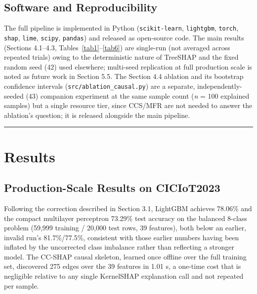 \subsection{Software and Reproducibility}\label{software-and-reproducibility}

The full pipeline is implemented in Python (\texttt{scikit-learn}, \texttt{lightgbm}, \texttt{torch}, \texttt{shap}, \texttt{lime}, \texttt{scipy}, \texttt{pandas}) and released as open-source code. The main results (Sections 4.1--4.3, Tables~\ref{tab1}--\ref{tab6}) are single-run (not averaged across repeated trials) owing to the deterministic nature of TreeSHAP and the fixed random seed (42) used elsewhere; multi-seed replication at full production scale is noted as future work in Section 5.5. The Section 4.4 ablation and its bootstrap confidence intervals (\texttt{src/ablation\_causal.py}) are a separate, independently-seeded (43) companion experiment at the same sample count (\emph{n} = 100 explained samples) but a single resource tier, since CCS/MFR are not needed to answer the ablation's question; it is released alongside the main pipeline.

\begin{center}\rule{0.5\linewidth}{0.5pt}\end{center}

\section{Results}\label{results}

\subsection{Production-Scale Results on CICIoT2023}\label{production-scale-results-on-ciciot2023}

Following the correction described in Section 3.1, LightGBM achieves 78.06\% and the compact multilayer perceptron 73.29\% test accuracy on the balanced 8-class problem (59,999 training / 20,000 test rows, 39 features), both below an earlier, invalid run's 81.7\%/77.5\%, consistent with those earlier numbers having been inflated by the uncorrected class imbalance rather than reflecting a stronger model. The CC-SHAP causal skeleton, learned once offline over the full training set, discovered 275 edges over the 39 features in 1.01 s, a one-time cost that is negligible relative to any single KernelSHAP explanation call and not repeated per sample.

